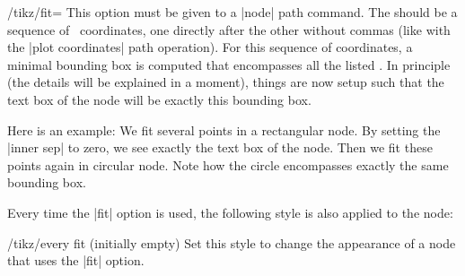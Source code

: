 \begin{key}{/tikz/fit=}
  This option must be given to a |node| path command. The
   should be a sequence of \tikzname\ coordinates,
  one directly after the other without commas (like with the
  |plot coordinates| path operation).  For this sequence of
  coordinates, a minimal bounding box is computed that
  encompasses all the listed . In principle (the
  details will be explained in a moment), things are now setup such
  that the text box of the node will be exactly this bounding box.

  Here is an example: We fit several points in a rectangular node. By
  setting the |inner sep| to zero, we see exactly the text box of the
  node. Then we fit these points again in circular node. Note how
  the circle encompasses exactly the same bounding box.
\begin{codeexample}[]
\end{codeexample}

  Every time the |fit| option is used, the following style is also
  applied to the node:
  \begin{stylekey}{/tikz/every fit (initially \normalfont empty)}
    Set this style to change the appearance of a node that uses the
    |fit| option.
  \end{stylekey}


\end{key}
